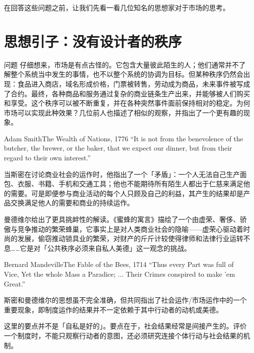 \documentclass[UTF8,10pt,a4paper,scheme=chinese,fontset=none]{ctexart}
\begin{document}
在回答这些问题之前，让我们先看一看几位知名的思想家对于市场的思考。

\section{思想引子：没有设计者的秩序}

\begin{keybox}{问题}
仔细想来，市场是有点古怪的。它包含大量彼此陌生的人；他们通常并不了解整个系统当中发生的事情，也不以整个系统的协调为目标。但某种秩序仍然会出现：食品进入商店，域名形成价格，门票被转售，劳动成为商品，未来事件被写成了合约。最终，各种商品和服务通过复杂的商业链条生产出来，并能够被人们购买和享受。这个秩序可以被不断重复，并在各种突然事件面前保持相对的稳定。为何市场可以实现此种效果？几位前人也描述了相似的观察，并指出了一个更有趣的现象。
\end{keybox}

\begin{quotebox}{Adam Smith}{The Wealth of Nations, 1776}
``It is not from the benevolence of the butcher, the brewer, or the baker, that we expect our dinner, but from their regard to their own interest.''
\end{quotebox}

当斯密在讨论商业社会的运作时，他指出了一个「矛盾」：一个人无法自己生产面包、衣服、书籍、手机和交通工具；他也不能期待所有陌生人都出于仁慈来满足他的需要。可是即便参与商业活动的每个人只顾及自己的利益，其产生的结果却是产品交换满足他人的需要和商业的持续运作。

曼德维尔给出了更具挑衅性的解读。《蜜蜂的寓言》描绘了一个由虚荣、奢侈、骄傲与竞争推动的繁荣蜂巢，它事实上是对人类商业社会的隐喻——虚荣心驱动着时尚的发展，偷窃推动锁具业的繁荣，对财产的斤斤计较使得律师和法律行业运转不息……它是对「公共秩序必须来自私人美德」这一观念的挑战。

\begin{quotebox}{Bernard Mandeville}{The Fable of the Bees, 1714}
``Thus every Part was full of Vice, Yet the whole Mass a Paradice; ... Their Crimes conspired to make 'em Great.''
\end{quotebox}

斯密和曼德维尔的思想虽不完全准确，但共同指出了社会运作/市场运作中的一个重要现象，即制度运作的结果并不一定依赖于其中行动者的动机或美德。

\begin{warningbox}{}
这里的要点并不是「自私是好的」。要点在于，社会结果经常是间接产生的。评价一个制度时，不能只观察行动者的意图，还必须研究连接个体行动与社会结果的机制。
\end{warningbox}
\end{document}
